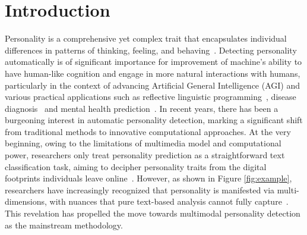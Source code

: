 \section{Introduction}

Personality is a comprehensive yet complex trait that encapsulates individual differences in patterns of thinking, feeling, and behaving~\citep{article}. Detecting personality automatically is of significant importance for improvement of machine's ability to have human-like cognition and engage in more natural interactions with humans, particularly in the context of advancing Artificial General Intelligence (AGI) and various practical applications such as reflective linguistic programming~\citep{fischer2023reflective}, disease diagnosis~\citep{6709853} and mental health prediction~\citep{feng2024far}. In recent years, there has been a burgeoning interest in automatic personality detection, marking a significant shift from traditional methods to innovative computational approaches. 
At the very beginning, owing to the limitations of multimedia model and computational power, researchers only treat personality prediction as a straightforward text classification task, aiming to decipher personality traits from the digital footprints individuals leave online~\citep{kerz2022pushing,yang_multi-document_2021}. However, as shown in Figure \ref{fig:example}, researchers have increasingly recognized that personality is manifested via multi-dimensions, with nuances that pure text-based analysis cannot fully capture~\citep{10.1145/3542954.3543012,ijcai2022p633,10030882}. This revelation has propelled the move towards multimodal personality detection as the mainstream methodology.
